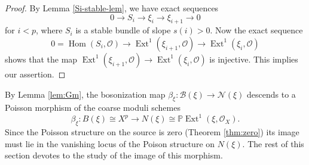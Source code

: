 \documentclass[reqno]{amsart}
\theoremstyle{definition}
\theoremstyle{remark}
\renewcommand{\P}{{\mathbb P}}
\newcommand{\Hom}{\operatorname{Hom}}
\newcommand{\Ext}{\operatorname{Ext}}
\newcommand{\OO}{{\mathcal O}}
\renewcommand{\b}{\beta}
\newcommand{\cO}{\mathcal{O}}
\newcommand{\sB}{\mathscr{B}}
\newcommand{\sN}{\mathscr{N}}
\newcommand{\am}{\overrightarrow{m}}
\newcommand{\amu}{\overrightarrow{\mu}}
\numberwithin{equation}{section}
\begin{document}
\begin{proof}
By Lemma \ref{Si-stable-lem}, we have exact sequences 
\[
0\to S_i\to \xi_i\to \xi_{i+1}\to 0
\] 
for $i<p$, where $S_i$ is a stable bundle of slope $s(i)>0$.
Now the exact sequence
$$0=\Hom(S_i,\cO)\to \Ext^1(\xi_{i+1},\OO)\to \Ext^1(\xi_i,\OO)$$
shows that the map $\Ext^1(\xi_{i+1},\OO)\to \Ext^1(\xi_i,\OO)$ is injective. This implies our assertion.
\end{proof}

By Lemma \ref{lem:Gm}, the bosonization map $\beta_\xi: \sB(\xi)\to \sN(\xi)$ descends to a Poisson morphism of the coarse moduli schemes
$$\b_\xi:B(\xi)\cong X^p\to N(\xi)\cong \P\Ext^1(\xi,\cO_X).$$ 
Since the Poisson structure on the source is zero (Theorem \ref{thm:zero}) its image must lie in the vanishing locus of the Poison structure on $N(\xi)$. The rest of this section devotes to the study of the image of this morphism. 
\end{document}
